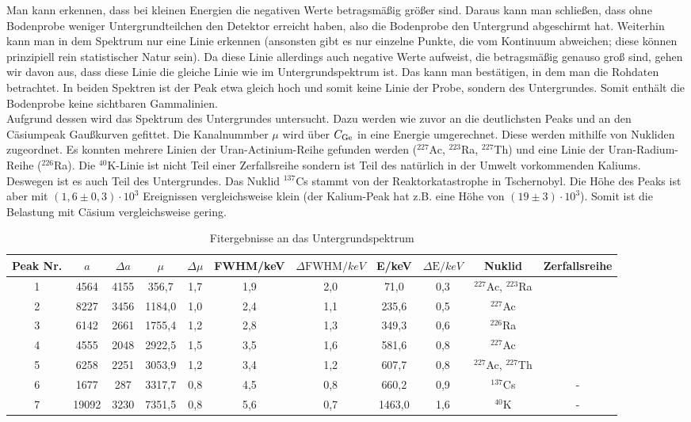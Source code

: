 Man kann erkennen, dass bei kleinen Energien die negativen Werte betragsmäßig größer sind. Daraus kann man schließen, dass ohne Bodenprobe weniger Untergrundteilchen den Detektor erreicht haben, also die Bodenprobe den Untergrund abgeschirmt hat. Weiterhin kann man in dem Spektrum nur eine Linie erkennen (ansonsten gibt es nur einzelne Punkte, die vom Kontinuum abweichen; diese können prinzipiell rein statistischer Natur sein). Da diese Linie allerdings auch negative Werte aufweist, die betragsmäßig genauso groß sind, gehen wir davon aus, dass diese Linie die gleiche Linie wie im Untergrundspektrum ist. Das kann man bestätigen, in dem man die Rohdaten betrachtet. In beiden Spektren ist der Peak etwa gleich hoch und somit keine Linie der Probe, sondern des Untergrundes. Somit enthält die Bodenprobe keine sichtbaren Gammalinien.\\

Aufgrund dessen wird das Spektrum des Untergrundes untersucht. Dazu werden wie zuvor an die deutlichsten Peaks und an den Cäsiumpeak Gaußkurven gefittet. Die Kanalnummber $\mu$ wird über $C_\mathrm{Ge}$ in eine Energie umgerechnet. Diese werden mithilfe von \cite{lara} Nukliden zugeordnet. Es konnten mehrere Linien der Uran-Actinium-Reihe gefunden werden ($^{227}$Ac, $^{223}$Ra, $^{227}$Th) und eine Linie der Uran-Radium-Reihe ($^{226}$Ra). Die $^{40}$K-Linie ist nicht Teil einer Zerfallsreihe sondern ist Teil des natürlich in der Umwelt vorkommenden Kaliums. Deswegen ist es auch Teil des Untergrundes. Das Nuklid $^{137}$Cs stammt von der Reaktorkatastrophe in Tschernobyl. Die Höhe des Peaks ist aber mit $(1,6 \pm 0,3) \cdot 10^3$ Ereignissen vergleichsweise klein (der Kalium-Peak hat z.B. eine Höhe von $(19 \pm 3)\cdot 10^3$). Somit ist die Belastung mit Cäsium vergleichsweise gering.

\begin{table}[h]
\caption{Fitergebnisse an das Untergrundspektrum}
\begin{tabular}{ccccccccccc}
\toprule
Peak Nr. & $a$ & $\Delta a$ & $\mu$ & $\Delta \mu$ & FWHM/\si{keV} & $\Delta \text{FWHM}/\si{keV}$& E/\si{keV}& $\Delta\text{E}/\si{keV}$ & Nuklid & Zerfallsreihe\\
\midrule 
1	&	4564	&	4155	&	356,7	&	1,7	&	1,9	&	2,0	&	71,0	&	0,3	&	$^{227}$Ac, $^{223}$Ra\\
2	&	8227	&	3456	&	1184,0	&	1,0	&	2,4	&	1,1	&	235,6	&	0,5	&	$^{227}$Ac\\
3	&	6142	&	2661	&	1755,4	&	1,2	&	2,8	&	1,3	&	349,3	&	0,6	&	$^{226}$Ra \\
4	&	4555	&	2048	&	2922,5	&	1,5	&	3,5	&	1,6	&	581,6	&	0,8	&	$^{227}$Ac \\
5	&	6258	&	2251	&	3053,9	&	1,2	&	3,4	&	1,2	&	607,7	&	0,8	&	$^{227}$Ac, $^{227}$Th\\
6	&	1677	&	287	&	3317,7	&	0,8	&	4,5	&	0,8	&	660,2	&	0,9	&	$^{137}$Cs & -\\
7	&	19092	&	3230	&	7351,5	&	0,8	&	5,6	&	0,7	&	1463,0	&	1,6	&	$^{40}$K & -\\
\bottomrule
\end{tabular}
\label{tab:ge}
\end{table}
